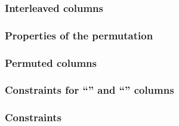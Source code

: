 \subsubsection{Interleaved columns                                         \lispDone{}}    \label{hub: consistencies: stack: interleavings}      
\subsubsection{Properties of the permutation                               \lispDone{}}    \label{hub: consistencies: stack: permutation}        
\subsubsection{Permuted columns                                            \lispDone{}}    \label{hub: consistencies: stack: columns}            
\subsubsection{Constraints for ``'' and ``'' columns \lispDone{}}    \label{hub: consistencies: stack: first and again}    
\subsubsection{Constraints                                                 \lispDone{}}    \label{hub: consistencies: stack: constraints}        

